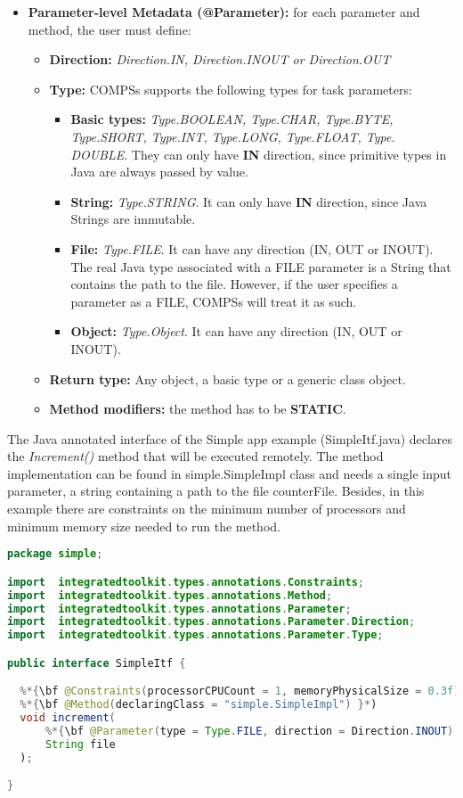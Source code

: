 \begin{itemize}
 \item {\bf Parameter-level Metadata (@Parameter):} for each parameter and method, the user must define:
       \begin{itemize}
        \item {\bf Direction:} {\it Direction.IN, Direction.INOUT or Direction.OUT}
        \item {\bf Type:} COMPSs supports the following types for task parameters:
              \begin{itemize}
               \item {\bf Basic types:} {\it Type.BOOLEAN, Type.CHAR, Type.BYTE, Type.SHORT, Type.INT, Type.LONG,
                     Type.FLOAT, Type. DOUBLE}. They can only have {\bf IN} direction, since primitive types in Java are
                     always passed by value.
               \item {\bf String:} {\it Type.STRING}. It can only have {\bf IN} direction, since Java Strings are immutable.
               \item {\bf File:} {\it Type.FILE}. It can have any direction (IN, OUT or INOUT). The real Java type associated
                     with a FILE parameter is a String that contains the path to the file. However, if the user specifies
                     a parameter as a FILE, COMPSs will treat it as such.
               \item {\bf Object:} {\it Type.Object}. It can have any direction (IN, OUT or INOUT).
              \end{itemize}
        \item {\bf Return type:} Any object, a basic type or a generic class object.
        \item {\bf Method modifiers:} the method has to be {\bf STATIC}.
       \end{itemize}
\end{itemize}

    
The Java annotated interface of the Simple app example (SimpleItf.java) declares the {\it Increment()} method
that will be executed remotely. The method implementation can be found in simple.SimpleImpl class and
needs a single input parameter, a string containing a path to the file counterFile. Besides, in this example
there are constraints on the minimum number of processors and minimum memory size needed to run the
method.

\begin{lstlisting}[language=java]
package simple;

import  integratedtoolkit.types.annotations.Constraints;
import  integratedtoolkit.types.annotations.Method;
import  integratedtoolkit.types.annotations.Parameter;
import  integratedtoolkit.types.annotations.Parameter.Direction;
import  integratedtoolkit.types.annotations.Parameter.Type;

public interface SimpleItf {

  %*{\bf @Constraints(processorCPUCount = 1, memoryPhysicalSize = 0.3f) }*)
  %*{\bf @Method(declaringClass = "simple.SimpleImpl") }*)
  void increment(
      %*{\bf @Parameter(type = Type.FILE, direction = Direction.INOUT) }*)
      String file
  );

}
\end{lstlisting}


